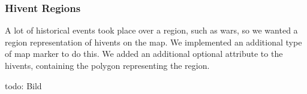 \subsubsection{Hivent Regions}
A lot of historical events took place over a region, such as wars, so we wanted a region representation of hivents on the map.
We implemented an additional type of map marker to do this.
We added an additional optional attribute to the hivents, containing the polygon representing the region.

todo: Bild





